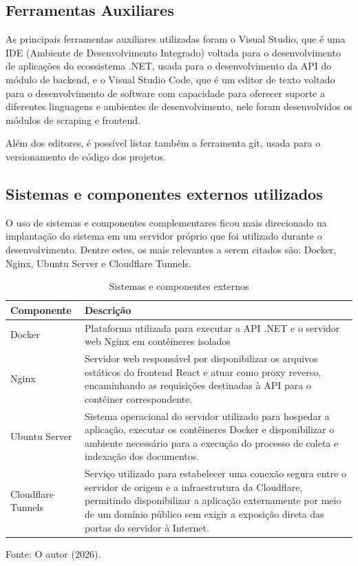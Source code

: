 \subsection{Ferramentas Auxiliares}

As principais ferramentas auxiliares utilizadas foram o Visual Studio, que é uma IDE (Ambiente de Desenvolvimento Integrado)
voltada para o desenvolvimento de aplicações do ecossistema .NET, usada para o desenvolvimento da API do módulo de backend, e o Visual Studio Code, que é um editor de texto voltado para o desenvolvimento de software com capacidade para oferecer suporte a diferentes linguagens e ambientes de desenvolvimento, nele foram desenvolvidos os módulos de scraping e frontend.

Além dos editores, é possível listar também a ferramenta git, usada para o versionamento de código dos projetos.


\subsection{Sistemas e componentes externos utilizados}

O uso de sistemas e componentes complementares ficou mais direcionado na implantação do sistema em um servidor próprio que foi utilizado durante o desenvolvimento. Dentre estes, os mais relevantes a serem citados são: Docker, Nginx, Ubuntu Server e Cloudflare Tunnels.

\begin{table}[h]
    \centering
    \caption{Sistemas e componentes externos}
    \label{tab:tabela_sistemas_e_componentes_externos}
    \begin{tabularx}{\textwidth}{l X}
        \toprule
        Componente & Descrição \\
        \midrule
        Docker & Plataforma utilizada para executar a API .NET e o servidor web Nginx em contêineres isolados \\
        Nginx & Servidor web responsável por disponibilizar os arquivos estáticos do frontend React e atuar como proxy reverso, encaminhando as requisições destinadas à API para o contêiner correspondente. \\
        Ubuntu Server & Sistema operacional do servidor utilizado para hospedar a aplicação, executar os contêineres Docker e disponibilizar o ambiente necessário para a execução do processo de coleta e indexação dos documentos. \\
        Cloudflare Tunnels & Serviço utilizado para estabelecer uma conexão segura entre o servidor de origem e a infraestrutura da Cloudflare, permitindo disponibilizar a aplicação externamente por meio de um domínio público sem exigir a exposição direta das portas do servidor à Internet. \\
        \bottomrule
    \end{tabularx}
\end{table}{\footnotesize Fonte: O autor (2026).}

